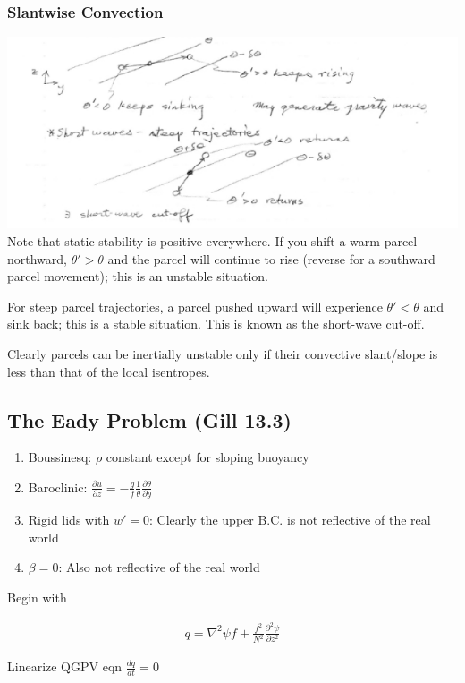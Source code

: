 \documentclass[a4paper,12pt]{article}
\begin{document}
\subsubsection*{Slantwise Convection}
\includegraphics[width=\textwidth]{bcli_2}
Note that static stability is positive everywhere. If you shift a warm parcel northward, $\theta' > \theta$ and the parcel will continue to rise (reverse for a southward parcel movement); this is an unstable situation. 

For steep parcel trajectories, a parcel pushed upward will experience $\theta'<\theta$ and sink back; this is a stable situation. This is known as the short-wave cut-off.

Clearly parcels can be inertially unstable only if their convective slant/slope is less than that of the local isentropes.

\subsection*{The Eady Problem (Gill 13.3)}
\begin{enumerate}
	\item Boussinesq: $\rho$ constant except for sloping buoyancy
	\item Baroclinic: $\frac{\partial u}{\partial z} = -\frac{g}{f}\frac{1}{\theta}\frac{\partial \theta}{\partial y}$
	\item Rigid lids with $w' = 0$: Clearly the upper B.C. is not reflective of the real world
	\item $\beta = 0$: Also not reflective of the real world
\end{enumerate}

Begin with

\begin{align*}
q = \nabla^2 \psi f + \frac{f^2}{N^2}\frac{\partial^2\psi}{\partial z^2}
\end{align*}

Linearize QGPV eqn $\frac{dq}{dt} = 0$
\end{document}
